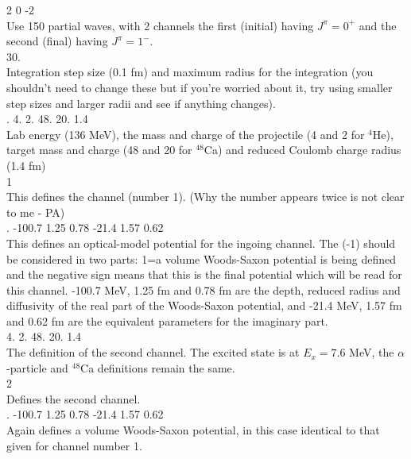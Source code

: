 \documentclass[a4paper,10pt]{article}
\begin{document}
  2  0 -2\\
Use 150 partial waves, with 2 channels the first (initial) having $J^\pi = 0^+$ and the second (final) having $J^\pi = 1^-$.\\

     30.\\
Integration step size (0.1 fm) and maximum radius for the integration (you shouldn't need to change these but if you're worried about it, try using smaller step sizes and larger radii and see if anything changes).\\

.    4.      2.      48.     20.     1.4\\
Lab energy (136 MeV), the mass and charge of the projectile (4 and 2 for $^4$He), target mass and charge (48 and 20 for $^{48}$Ca) and reduced Coulomb charge radius (1.4 fm)\\

  1\\
This defines the channel (number 1). (Why the number appears twice is not clear to me - PA)\\
  
.     -100.7  1.25    0.78            -21.4   1.57    0.62\\
This defines an optical-model potential for the ingoing channel. The (-1) should be considered in two parts: 1=a volume Woods-Saxon potential is being defined and the negative sign means that this is the final potential which will be read for this channel. -100.7 MeV, 1.25 fm and 0.78 fm are the depth, reduced radius and diffusivity of the real part of the Woods-Saxon potential, and -21.4 MeV, 1.57 fm and 0.62 fm are the equivalent parameters for the imaginary part.\\

  4.      2.      48.     20.     1.4\\
The definition of the second channel. The excited state is at $E_x = 7.6$ MeV, the $\alpha$-particle and $^{48}$Ca definitions remain the same.\\

  2\\
Defines the second channel.\\
  
.     -100.7  1.25    0.78            -21.4   1.57    0.62\\
Again defines a volume Woods-Saxon potential, in this case identical to that given for channel number 1.\\
\end{document}
